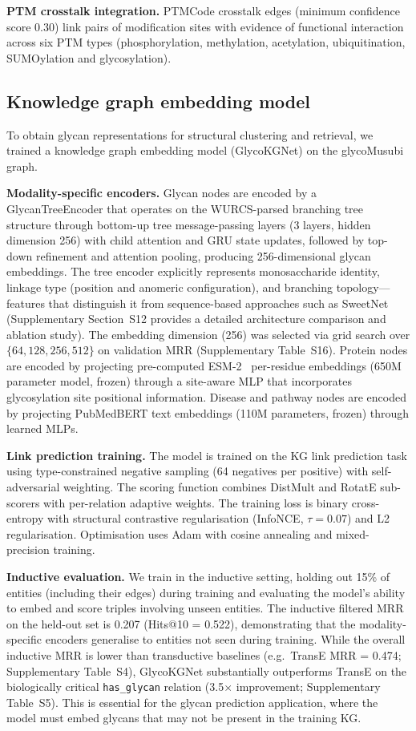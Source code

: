 \documentclass[11pt,a4paper]{article}
\begin{document}
\textbf{PTM crosstalk integration.} PTMCode crosstalk edges (minimum confidence
score 0.30) link pairs of modification sites with evidence of functional
interaction across six PTM types (phosphorylation, methylation, acetylation,
ubiquitination, SUMOylation and glycosylation).

\subsection{Knowledge graph embedding model}

To obtain glycan representations for structural clustering and retrieval, we
trained a knowledge graph embedding model (GlycoKGNet) on the glycoMusubi graph.

\textbf{Modality-specific encoders.} Glycan nodes are encoded by a
GlycanTreeEncoder that operates on the WURCS-parsed branching tree structure
through bottom-up tree message-passing layers (3 layers, hidden dimension 256)
with child attention and GRU state updates, followed by top-down refinement and
attention pooling, producing 256-dimensional glycan embeddings. The tree encoder
explicitly represents monosaccharide identity, linkage type (position and
anomeric configuration), and branching topology---features that distinguish it
from sequence-based approaches such as SweetNet~\cite{burkholz2022}
(Supplementary Section~S12 provides a detailed architecture comparison and
ablation study). The embedding dimension (256) was selected via grid search over
$\{64, 128, 256, 512\}$ on validation MRR (Supplementary Table~S16). Protein
nodes are encoded by projecting pre-computed ESM-2~\cite{lin2023} per-residue
embeddings (650M parameter model, frozen) through a site-aware MLP that
incorporates glycosylation site positional information. Disease and pathway nodes
are encoded by projecting PubMedBERT text embeddings (110M parameters, frozen)
through learned MLPs.

\textbf{Link prediction training.} The model is trained on the KG link prediction
task using type-constrained negative sampling (64 negatives per positive) with
self-adversarial weighting. The scoring function combines DistMult and RotatE
sub-scorers with per-relation adaptive weights. The training loss is binary
cross-entropy with structural contrastive regularisation (InfoNCE,
$\tau = 0.07$) and L2 regularisation. Optimisation uses Adam with cosine
annealing and mixed-precision training.

\textbf{Inductive evaluation.} We train in the inductive setting, holding out
15\% of entities (including their edges) during training and evaluating the
model's ability to embed and score triples involving unseen entities. The
inductive filtered MRR on the held-out set is 0.207 (Hits@10 = 0.522),
demonstrating that the modality-specific encoders generalise to entities not
seen during training. While the overall inductive MRR is lower than transductive
baselines (e.g.\ TransE MRR = 0.474; Supplementary Table~S4), GlycoKGNet
substantially outperforms TransE on the biologically critical
\texttt{has\_glycan} relation (3.5$\times$ improvement; Supplementary Table~S5).
This is essential for the glycan prediction application, where the model must
embed glycans that may not be present in the training KG.
\end{document}
